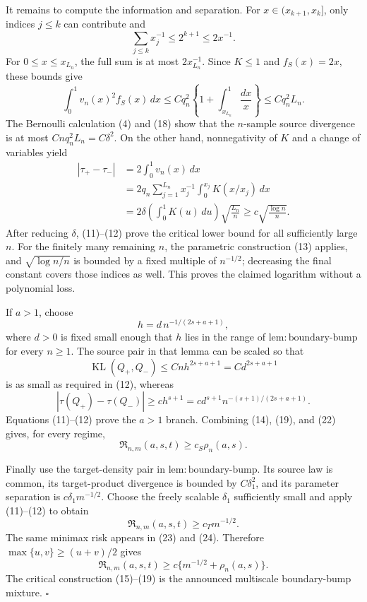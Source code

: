 It remains to compute the information and separation.  For \(x\in(x_{k+1},x_k]\), only indices \(j\le k\) can contribute and
\[
\sum_{j\le k}x_j^{-1}\le 2^{k+1}\le2x^{-1}.
\]
For \(0\le x\le x_{L_n}\), the full sum is at most \(2x_{L_n}^{-1}\).  Since \(K\le1\) and \(f_S(x)=2x\), these bounds give
\[
\int_0^1v_n(x)^2f_S(x)\,dx
\le Cq_n^2\left\{1+\int_{x_{L_n}}^1\frac{dx}{x}\right\}
\le Cq_n^2L_n.
\tag{18}
\]
The Bernoulli calculation (4) and (18) show that the \(n\)-sample source divergence is at most \(Cnq_n^2L_n=C\delta^2\).  On the other hand, nonnegativity of \(K\) and a change of variables yield
\[
\begin{aligned}
|\tau_+-\tau_-|
&=2\int_0^1v_n(x)\,dx\\
&=2q_n\sum_{j=1}^{L_n}x_j^{-1}
 \int_0^{x_j}K(x/x_j)\,dx\\
&=2\delta\left(\int_0^1K(u)\,du\right)
 \sqrt{\frac{L_n}{n}}
\ge c\sqrt{\frac{\log n}{n}}.
\end{aligned}
\tag{19}
\]
After reducing \(\delta\), (11)--(12) prove the critical lower bound for all sufficiently large \(n\).  For the finitely many remaining \(n\), the parametric construction (13) applies, and \(\sqrt{\log n/n}\) is bounded by a fixed multiple of \(n^{-1/2}\); decreasing the final constant covers those indices as well.  This proves the claimed logarithm without a polynomial loss.

If \(a>1\), choose
\[
h=d\,n^{-1/(2s+a+1)},
\tag{20}
\]
where \(d>0\) is fixed small enough that \(h\) lies in the range of \(\mathrm{lem:boundary\text{-}bump}\) for every \(n\ge1\).  The source pair in that lemma can be scaled so that
\[
\operatorname{KL}(Q_+,Q_-)
\le Cnh^{2s+a+1}=Cd^{2s+a+1}
\tag{21}
\]
is as small as required in (12), whereas
\[
|\tau(Q_+)-\tau(Q_-)|
\ge ch^{s+1}
=cd^{s+1}n^{-(s+1)/(2s+a+1)}.
\tag{22}
\]
Equations (11)--(12) prove the \(a>1\) branch.  Combining (14), (19), and (22) gives, for every regime,
\[
\mathfrak R_{n,m}(a,s,t)\ge c_S\rho_n(a,s).
\tag{23}
\]

Finally use the target-density pair in \(\mathrm{lem:boundary\text{-}bump}\).  Its source law is common, its target-product divergence is bounded by \(C\delta_1^2\), and its parameter separation is \(c\delta_1m^{-1/2}\).  Choose the freely scalable \(\delta_1\) sufficiently small and apply (11)--(12) to obtain
\[
\mathfrak R_{n,m}(a,s,t)\ge c_Tm^{-1/2}.
\tag{24}
\]
The same minimax risk appears in (23) and (24).  Therefore \(\max\{u,v\}\ge(u+v)/2\) gives
\[
\mathfrak R_{n,m}(a,s,t)
\ge c\{m^{-1/2}+\rho_n(a,s)\}.
\]
The critical construction (15)--(19) is the announced multiscale boundary-bump mixture. \(\square\)